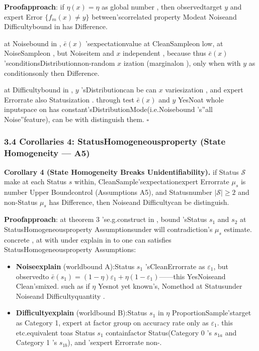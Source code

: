 \documentclass[
  12pt,
]{article}
\begin{document}
\textbf{Proofapproach}: if  \(\eta(x) = \eta\) as global number , then observedtarget  \(y\)
and expert Error \(\{f_m(x) \neq y\}\)
between'scorrelated property Modeat Noiseand Difficultybound in has Difference. 

at Noisebound in , \(\bar{e}(x)\)
'sexpectationvalue at CleanSampleon low, at NoiseSampleon , but Noiseitem and  \(x\) independent , because thus
\(\bar{e}(x)\) 'sconditionsDistributionnon-random \(x\) ization (marginalon ), only when with  \(y\)
as conditionsonly then Difference. 

at Difficultybound in , \(y\) 'sDistributioncan be can  \(x\)
variesization , and expert Errorrate also Statusization . through test \(\bar{e}(x)\) and  \(y\)
YesNoat whole inputspace on has constant'sDistributionMode(i.e.Noisebound 's''all Noise''feature), can be with distinguish them. \(\square\)

\subsubsection{3.4 Corollaries 4: StatusHomogeneousproperty  (State Homogeneity ---
A5)}\label{ux63a8ux8bba-4ux72b6ux6001ux540cux8d28ux6027-state-homogeneity-a5}

\textbf{Corollary 4 (State Homogeneity Breaks Unidentifiability).}
if Status \(\mathcal{S}\) make at each Status \(s\)
within, CleanSample'sexpectationexpert Errorrate  \(\mu_s\) is number Upper Boundcontrol (Assumptions
A5), and Statusnumber  \(|\mathcal{S}| \geq 2\) and non-Status \(\mu_s\)
has Difference, then Noiseand Difficultycan be distinguish. 

\textbf{Proofapproach}: at theorem  3 'se.g.construct in , bound 'sStatus \(s_1\) and 
\(s_2\) at StatusHomogeneousproperty Assumptionsunder will contradiction's \(\mu_s\)
estimate. concrete , at with under explain in to one can satisfies StatusHomogeneousproperty Assumptions: 

\begin{itemize}
\item
  \textbf{Noiseexplain }(worldbound  A):Status \(s_1\) 'sCleanErrorrate as 
  \(\varepsilon_1\), but observedto 
  \(\bar{e}(s_1) = (1-\eta)\varepsilon_1 + \eta(1-\varepsilon_1)\)------this YesNoiseand Clean'smixed. such as if
  \(\eta\) Yesnot yet known's, Nomethod at Statusunder Noiseand Difficultyquantity . 
\item
  \textbf{Difficultyexplain }(worldbound  B):Status \(s_1\) in  \(\eta\)
  ProportionSample'starget as Category 1, expert at factor group on accuracy rate only as 
  \(\varepsilon_1\). this etc.equivalent toas Status \(s_1\) containfactor Status(Category 0 's
  \(s_{1a}\) and Category 1 's \(s_{1b}\)), and 'sexpert Errorrate non-. 
\end{itemize}
\end{document}
